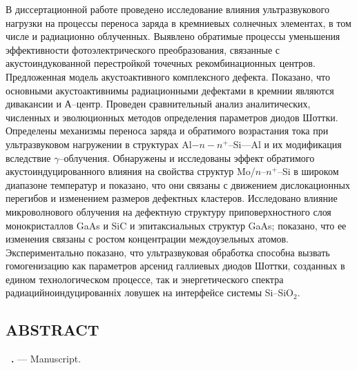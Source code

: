 В диссертационной работе проведено исследование влияния ультразвукового нагрузки на процессы переноса заряда в кремниевых солнечных элементах,
 в том числе и радиационно облученных.
 Выявлено обратимые процессы уменьшения эффективности фотоэлектрического преобразования,
 связанные с акустоиндукованной перестройкой точечных рекомбинационных центров.
 Предложенная модель акустоактивного комплексного дефекта.
 Показано, что основными акустоактивнимы радиационными дефектами в кремнии являются дивакансии и А--центр.
 Проведен сравнительный анализ аналитических, численных и эволюционных методов определения параметров диодов Шоттки.
 Определены механизмы переноса заряда и обратимого возрастания тока при ультразвуковом нагружении
 в структурах Al$-n-n^+$--Si---Al и их модификация вследствие $\gamma$--облучения.
 Обнаружены и исследованы эффект обратимого акустоиндуцированного влияния на свойства структур Mo/$n$--$n^{+}$--Si в широком диапазоне температур
 и показано, что они связаны с движением дислокационных перегибов и изменением размеров дефектных кластеров.
 Исследовано влияние микроволнового облучения на дефектную структуру приповерхностного слоя монокристаллов GaAs и SiC и эпитаксиальных структур GaAs; 
 показано,  что ее изменения связаны с ростом концентрации междоузельных атомов.
 Экспериментально показано, что ультразвуковая обработка способна вызвать гомогенизацию как параметров арсенид галлиевых диодов Шоттки, созданных в едином технологическом процессе, так и энергетического спектра радиацийноиндуцированніх ловушек на интерфейсе системы Si--SiO$_2$.


\keywordsRu


\begin{center}
{\section*{\MakeUppercase{ABSTRACT}}}
\end{center}

\textbf{\thesisAuthorFIOen~\thesisTitleEn.} ---  Manuscript.

\abstractBeginEn

